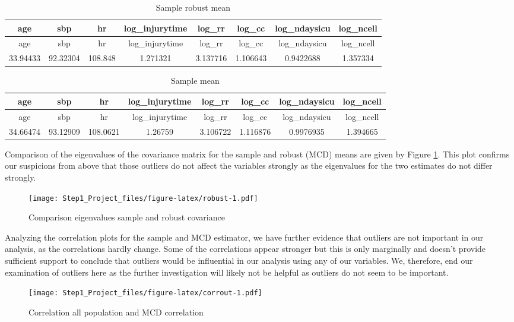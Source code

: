 \documentclass[
]{article}
\begin{document}
\begin{longtable}[]{@{}cccccccc@{}}
\caption{Sample robust mean}\tabularnewline
\toprule
age & sbp & hr & log\_injurytime & log\_rr & log\_cc & log\_ndaysicu &
log\_ncell\tabularnewline
\midrule
\endfirsthead
\toprule
age & sbp & hr & log\_injurytime & log\_rr & log\_cc & log\_ndaysicu &
log\_ncell\tabularnewline
\midrule
\endhead
33.94433 & 92.32304 & 108.848 & 1.271321 & 3.137716 & 1.106643 &
0.9422688 & 1.357334\tabularnewline
\bottomrule
\end{longtable}

\begin{longtable}[]{@{}cccccccc@{}}
\caption{Sample mean}\tabularnewline
\toprule
age & sbp & hr & log\_injurytime & log\_rr & log\_cc & log\_ndaysicu &
log\_ncell\tabularnewline
\midrule
\endfirsthead
\toprule
age & sbp & hr & log\_injurytime & log\_rr & log\_cc & log\_ndaysicu &
log\_ncell\tabularnewline
\midrule
\endhead
34.66474 & 93.12909 & 108.0621 & 1.26759 & 3.106722 & 1.116876 &
0.9976935 & 1.394665\tabularnewline
\bottomrule
\end{longtable}

Comparison of the eigenvalues of the covariance matrix for the sample
and robust (MCD) means are given by Figure \ref{fig:robust}. This plot
confirms our suspicions from above that those outliers do not affect the
variables strongly as the eigenvalues for the two estimates do not
differ strongly.

\begin{figure}
\centering
\texttt{[image: Step1\_Project\_files/figure-latex/robust-1.pdf]}
\caption{Comparison eigenvalues sample and robust
covariance\label{fig:robust}}
\end{figure}

Analyzing the correlation plots for the sample and MCD estimator, we
have further evidence that outliers are not important in our analysis,
as the correlations hardly change. Some of the correlations appear
stronger but this is only marginally and doesn't provide sufficient
support to conclude that outliers would be influential in our analysis
using any of our variables. We, therefore, end our examination of
outliers here as the further investigation will likely not be helpful as
outliers do not seem to be important.

\begin{figure}
\centering
\texttt{[image: Step1\_Project\_files/figure-latex/corrout-1.pdf]}
\caption{Correlation all population and MCD
correlation\label{fig:corrout}}
\end{figure}
\end{document}
